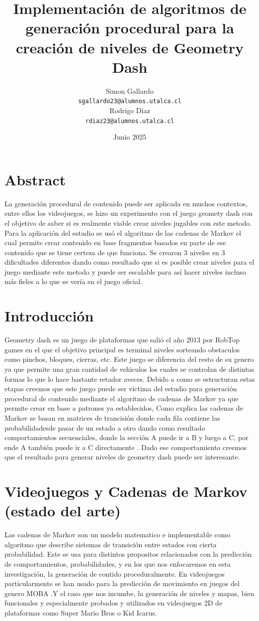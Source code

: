 \documentclass{article}
\title{Implementación de algoritmos de generación procedural para la creación de niveles de Geometry Dash}
\author{
    \begin{minipage}{0.5\textwidth}
        \centering
        \small
        Simon Gallardo \\
        \texttt{sgallardo23@alumnos.utalca.cl}
    \end{minipage}%
    \begin{minipage}{0.5\textwidth}
        \centering
        \small
        Rodrigo Díaz \\
        \texttt{rdiaz23@alumnos.utalca.cl}
    \end{minipage}
}
\date{Junio 2025}
\begin{document}
\maketitle
\section{Abstract}
La generación procedural de contenido puede ser aplicada en muchos contextos, entre ellos los videojuegos, se hizo un experimento con el juego geomety dash con el objetivo de saber si es realmente viable crear niveles jugables con este metodo. Para la aplicación del estudio se usó el algoritmo de las cadenas de Markov el cual permite crear contenido en base fragmentos basados en parte de ese contenido que se tiene certeza de que funciona. Se crearon 3 niveles en 3 dificultades diferentes dando como resultado que si es posible crear niveles para el juego mediante este metodo y puede ser escalable para así hacer niveles incluso más fieles a lo que se vería en el juego oficial.

\section{Introducción}
Geometry dash es un juego de plataformas que salió el año 2013 por RobTop games en el que el objetivo principal es terminal niveles sorteando obstaculos como pinchos, bloques, cierras, etc. Este juego se diferencia del resto de su genero ya que permite una gran cantidad de vehiculos los cuales se controlan de distintas formas lo que lo hace bastante retador aveces. Debido a como se estructuran estas etapas creemos que este juego puede ser victima del estudio para generación procedural de contenido mediante el algoritmo de cadenas de Markov ya que permite crear en base a patrones ya establecidos, Como explica \cite{barriola2016pagerank} las cadenas de Markov se basan en matrices de trancisión donde cada fila contiene las probabilidadesde pasar de un estado a otro dando como resultado comportamientos secuenciales, donde la sección A puede ir a B y luego a C, por ende A también puede ir a C directamente \cite{gagniuc2017markov}. Dado ese comportamiento creemos que el resultado para generar niveles de geometry dash puede ser interesante.



\section{Videojuegos y Cadenas de Markov (estado del arte)}
Las cadenas de Markov son un modelo matematico e implementable como algoritmo que describe sistemas de transición entre estados con cierta probabilidad. Este se usa para distintos propositos relacionados con la predicción de comportamientos, probabilidades, y en los que nos enfocaremos en esta investigación, la generación de contido proceduralmente. En videojuegos particularmente se han usado para la predicción de movimiento en juegos del genero MOBA \cite{zhang2019moba}.Y el caso que nos incumbe, la generación de niveles y mapas, bien funcionales y especialmente probados y utilizados en videojuegos 2D de plataformas como Super Mario Bros o Kid Icarus\cite{snodgrass2017markov}.
\end{document}
